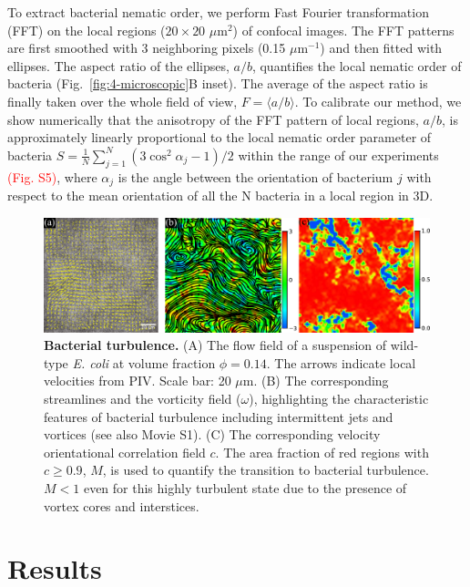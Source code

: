 To extract bacterial nematic order, we perform Fast Fourier transformation (FFT) on the local regions ($20 \times 20$ $\mu$m$^2$) of confocal images.
The FFT patterns are first smoothed with 3 neighboring pixels (0.15 $\mu$m$^{-1}$) and then fitted with ellipses. The aspect ratio of the ellipses, $a/b$, quantifies the local nematic order of bacteria (Fig.~\ref{fig:4-microscopic}B inset).
The average of the aspect ratio is finally taken over the whole field of view, $F = \langle a/b \rangle$. To calibrate our method, we show numerically that the anisotropy of the FFT pattern of local regions, $a/b$, is approximately linearly proportional to the local nematic order parameter of bacteria $S=\frac{1}{N}\sum_{j=1}^N(3\cos^2\alpha_j - 1)/2$ within the range of our experiments \textcolor{red}{(Fig. S5)}, where $\alpha_j$ is the angle between the orientation of bacterium $j$ with respect to the mean orientation of all the N bacteria in a local region in 3D.

\begin{figure}[!ht]
	\begin{center}
	\includegraphics[width=5.5 in]{Figs/4-Emergence/1.pdf}
	\end{center}
	\caption[Bacterial turbulence]
	{
	\textbf{Bacterial turbulence.}
  (A) The flow field of a suspension of wild-type \textit{E. coli} at volume fraction $\phi=0.14$. The arrows indicate local velocities from PIV. Scale bar: 20 $\mu$m.
  (B) The corresponding streamlines and the vorticity field ($\omega$), highlighting the characteristic features of bacterial turbulence including intermittent jets and vortices (see also Movie S1).
  (C) The corresponding velocity orientational correlation field $c$. The area fraction of red regions with $c \ge 0.9$, $M$, is used to quantify the transition to bacterial turbulence. $M < 1$ even for this highly turbulent state due to the presence of vortex cores and interstices.
	}
	\label{fig:4-turbulence}
\end{figure}

\section{Results}

